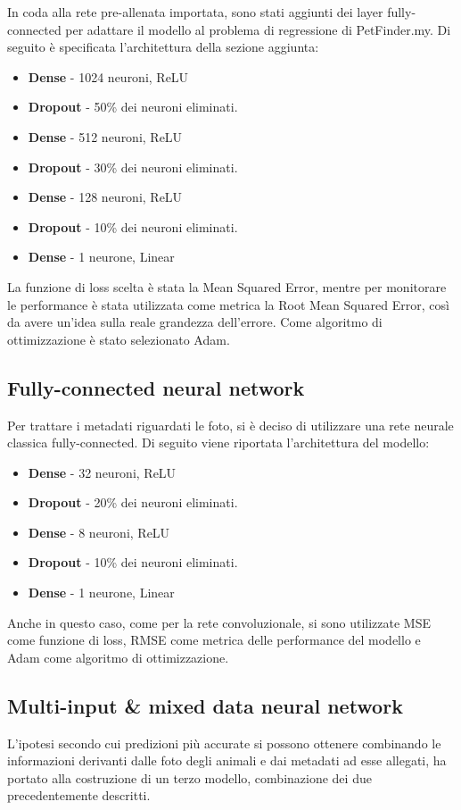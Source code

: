         In coda alla rete pre-allenata importata, sono stati aggiunti dei layer fully-connected per adattare il modello al problema di regressione di PetFinder.my. Di seguito
        è specificata l'architettura della sezione aggiunta:
        \begin{itemize}
            \item \textbf{Dense} - 1024 neuroni, ReLU
            \item \textbf{Dropout} - 50\% dei neuroni eliminati.
            \item \textbf{Dense} - 512 neuroni, ReLU
            \item \textbf{Dropout} - 30\% dei neuroni eliminati.
            \item \textbf{Dense} - 128 neuroni, ReLU
            \item \textbf{Dropout} - 10\% dei neuroni eliminati.
            \item \textbf{Dense} - 1 neurone, Linear
        \end{itemize}
        La funzione di loss scelta è stata la Mean Squared Error, mentre per monitorare le performance è stata utilizzata come metrica la Root Mean Squared Error, così da 
        avere un'idea sulla reale grandezza dell'errore. Come algoritmo di ottimizzazione è stato selezionato Adam.

    \subsection{Fully-connected neural network}
    \label{mlp}
    Per trattare i metadati riguardati le foto, si è deciso di utilizzare una rete neurale classica fully-connected. Di seguito viene 
    riportata l'architettura del modello:
    \begin{itemize}
        \item \textbf{Dense} - 32 neuroni, ReLU
        \item \textbf{Dropout} - 20\% dei neuroni eliminati.
        \item \textbf{Dense} - 8 neuroni, ReLU
        \item \textbf{Dropout} - 10\% dei neuroni eliminati.
        \item \textbf{Dense} - 1 neurone, Linear
    \end{itemize}
    Anche in questo caso, come per la rete convoluzionale, si sono utilizzate MSE come funzione di loss, RMSE come metrica delle performance del modello e Adam come algoritmo di ottimizzazione.

    \subsection{Multi-input \& mixed data neural network}
    \label{mulinput}
    L'ipotesi secondo cui predizioni più accurate si possono ottenere combinando le informazioni derivanti dalle foto degli animali e dai metadati ad esse allegati, ha portato alla
    costruzione di un terzo modello, combinazione dei due precedentemente descritti.

